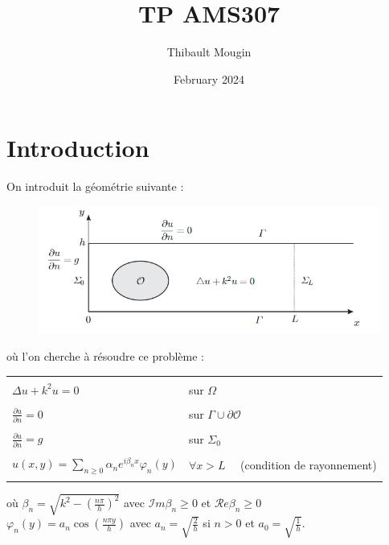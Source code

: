 \documentclass{article}
\title{TP AMS307}
\author{Thibault Mougin}
\date{February 2024}
\begin{document}
\maketitle

\section{Introduction}
On introduit la géométrie suivante : 
\begin{figure}[htbp]
    \centering
    \includegraphics[trim ={0 0.2cm 0 0cm},clip, scale=0.5]{image(1).png}
\end{figure}

où l'on cherche à résoudre ce problème : \\

\begin{tabular}{|ll|}
\hline 
& \\
$ \displaystyle \Delta u+k^2 u=0$ & sur $\Omega$ \\
& \\
$\displaystyle \frac{\partial u}{\partial n}=0$ & sur $\Gamma \cup \partial \mathcal{O}$ \\
& \\
$\displaystyle \frac{\partial u}{\partial n}=g$ & sur $\Sigma_0$ \\
& \\
$\displaystyle u(x, y)=\sum_{n \geq 0} \alpha_n e^{i \beta_n x} \varphi_n(y)$ & $\forall x>L \quad$ (condition de rayonnement)\\
& \\
\hline 
\end{tabular} \vskip 0.2in 
où $\displaystyle \beta_n=\sqrt{k^2-\left(\frac{n \pi}{h}\right)^2}$ avec $\mathcal{I} m \beta_n \geq 0$ et $\mathcal{R} e \beta_n \geq 0$
 \\ \null \quad \; $\displaystyle \varphi_n(y)=a_n \cos \left(\frac{n \pi y}{h}\right)$ avec $\displaystyle a_n=\sqrt{\frac{2}{h}}$ si $n>0$ et $\displaystyle a_0=\sqrt{\frac{1}{h}}$. \\
 
\end{document}
